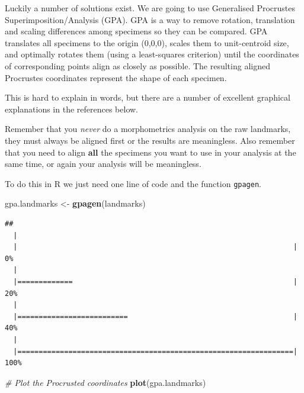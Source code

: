 \documentclass[]{book}
\newenvironment{Shaded}{\begin{snugshade}}{\end{snugshade}}
\newcommand{\KeywordTok}[1]{\textcolor[rgb]{0.13,0.29,0.53}{\textbf{{#1}}}}
\newcommand{\StringTok}[1]{\textcolor[rgb]{0.31,0.60,0.02}{{#1}}}
\newcommand{\CommentTok}[1]{\textcolor[rgb]{0.56,0.35,0.01}{\textit{{#1}}}}
\newcommand{\NormalTok}[1]{{#1}}
\begin{document}
Luckily a number of solutions exist. We are going to use Generalised
Procrustes Superimposition/Analysis (GPA). GPA is a way to remove
rotation, translation and scaling differences among specimens so they
can be compared. GPA translates all specimens to the origin (0,0,0),
scales them to unit-centroid size, and optimally rotates them (using a
least-squares criterion) until the coordinates of corresponding points
align as closely as possible. The resulting aligned Procrustes
coordinates represent the shape of each specimen.

This is hard to explain in words, but there are a number of excellent
graphical explanations in the references below.

Remember that you \emph{never} do a morphometrics analysis on the raw
landmarks, they must always be aligned first or the results are
meaningless. Also remember that you need to align \textbf{all} the
specimens you want to use in your analysis at the same time, or again
your analysis will be meaningless.

To do this in R we just need one line of code and the function
\texttt{gpagen}.

\begin{Shaded}
\begin{Highlighting}[]
\NormalTok{gpa.landmarks <-}\StringTok{ }\KeywordTok{gpagen}\NormalTok{(landmarks)}
\end{Highlighting}
\end{Shaded}

\begin{verbatim}
## 
  |                                                                       
  |                                                                 |   0%
  |                                                                       
  |=============                                                    |  20%
  |                                                                       
  |==========================                                       |  40%
  |                                                                       
  |=================================================================| 100%
\end{verbatim}

\begin{Shaded}
\begin{Highlighting}[]
\CommentTok{# Plot the Procrusted coordinates }
\KeywordTok{plot}\NormalTok{(gpa.landmarks)}
\end{Highlighting}
\end{Shaded}
\end{document}
